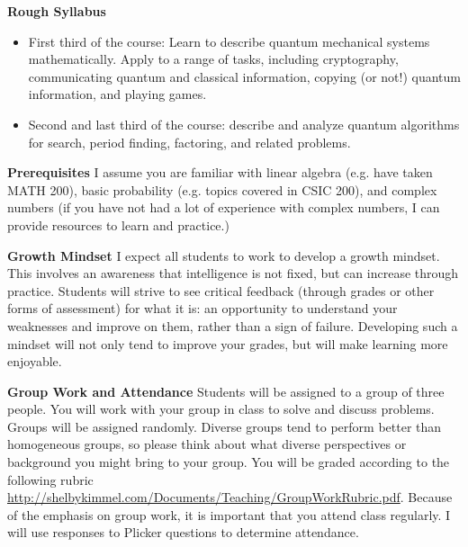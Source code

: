 \documentclass[11pt]{article}
\begin{document}
\medskip

{\bf Rough Syllabus}
\begin{itemize}
\item First third of the course: Learn to describe quantum mechanical systems mathematically. Apply to a range of tasks, including cryptography, communicating quantum and classical information, copying (or not!) quantum information, and playing games.
\item Second and last third of the course: describe and analyze quantum algorithms for search, period finding, factoring, and related problems.
\end{itemize}

\medskip



{\bf Prerequisites }I assume you are familiar with linear algebra (e.g. have taken MATH 200), basic probability (e.g. topics covered in CSIC 200), and complex numbers (if you have not had a lot of experience with complex numbers, I can provide resources to learn and practice.)


\medskip
{\bf Growth Mindset}
I expect all students to work to develop a growth mindset. This involves an awareness that intelligence is not fixed, but can increase through practice. Students will strive to see critical feedback (through grades or other forms of assessment) for what it is: an opportunity to understand your weaknesses and improve on them, rather than a sign of failure. Developing such a mindset will not only tend to improve your grades, but will make learning more enjoyable.

\medskip
{\bf Group Work and Attendance} Students will be assigned to a group of three
people. You will work with your group in class to solve and discuss problems.
Groups will be assigned randomly. Diverse groups tend to perform better than
homogeneous groups, so please think about what diverse perspectives or
background you might bring to your group. You will be graded according to the
following rubric \url{http://shelbykimmel.com/Documents/Teaching/GroupWorkRubric.pdf}.
Because of the emphasis on group work, it is important that you attend class regularly. I will use responses to Plicker questions to determine attendance.


\end{document}
